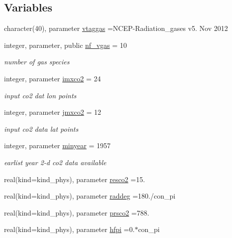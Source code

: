 \subsection*{Variables}
\begin{DoxyCompactItemize}
\item 
character(40), parameter \hyperlink{namespacemodule__radiation__gases_a8a79a6d3d931da021cd19290c58bdfaa}{vtaggas} =\textquotesingle{}N\+C\+EP-\/Radiation\+\_\+gases v5. Nov 2012 \textquotesingle{}
\item 
integer, parameter, public \hyperlink{namespacemodule__radiation__gases_affc350828412da77ff3cf3e617ddc66c}{nf\+\_\+vgas} = 10
\begin{DoxyCompactList}\small\item\em number of gas species \end{DoxyCompactList}\item 
integer, parameter \hyperlink{namespacemodule__radiation__gases_a46eb4079ff9932819b3ab133bf6a43d9}{imxco2} = 24
\begin{DoxyCompactList}\small\item\em input co2 dat lon points \end{DoxyCompactList}\item 
integer, parameter \hyperlink{namespacemodule__radiation__gases_aa56e209872093bfcbdaeb452f5e5e332}{jmxco2} = 12
\begin{DoxyCompactList}\small\item\em input co2 data lat points \end{DoxyCompactList}\item 
integer, parameter \hyperlink{namespacemodule__radiation__gases_a3b26af64187b57999cadeced419b0f1b}{minyear} = 1957
\begin{DoxyCompactList}\small\item\em earlist year 2-\/d co2 data available \end{DoxyCompactList}\item 
real(kind=kind\+\_\+phys), parameter \hyperlink{namespacemodule__radiation__gases_afda5c1d1129d865b9772e0f58dea7598}{resco2} =15.
\item 
real(kind=kind\+\_\+phys), parameter \hyperlink{namespacemodule__radiation__gases_aa5873ae54e950001ff873771378e7a1e}{raddeg} =180./con\+\_\+pi
\item 
real(kind=kind\+\_\+phys), parameter \hyperlink{namespacemodule__radiation__gases_ab09dc05b8a02e9a0b56991508b599708}{prsco2} =788.
\item 
real(kind=kind\+\_\+phys), parameter \hyperlink{namespacemodule__radiation__gases_ab99c75954c59ed92a52de94ca6113f73}{hfpi} =0.$\ast$con\+\_\+pi

\end{DoxyCompactItemize}
